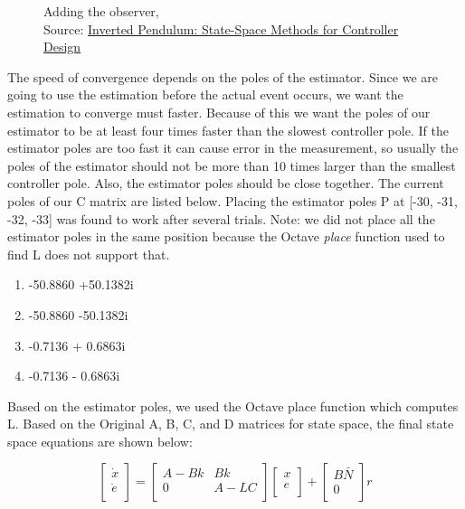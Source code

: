 \documentclass{article}
\begin{document}
\begin{figure}
\begin{minipage}[c]{0.45\textwidth}
{{	\label{fig:bd2}
}}
\end{minipage}
\caption{Adding the observer, \\ Source: \href{http://ctms.engin.umich.edu/CTMS/index.php?example=InvertedPendulum&section=ControlStateSpace}{Inverted Pendulum: State-Space Methods for Controller Design}}
\end{figure}


\clearpage

The speed of convergence depends on the poles of the estimator. Since we are going to use the estimation before the actual event occurs, we want the estimation to converge must faster. Because of this we want the poles of our estimator to be at least four times faster than the slowest controller pole. If the estimator poles are too fast it can cause error in the measurement, so usually the poles of the estimator should not be more than 10 times larger than the smallest controller pole. Also, the estimator poles should be close together. The current poles of our C matrix are listed below. Placing the estimator poles P at [-30, -31, -32, -33] was found to work after several trials. Note: we did not place all the estimator poles in the same position because the Octave \textit{place} function used to find L does not support that.
\begin{enumerate}
  \item  -50.8860 +50.1382i
  \item -50.8860 -50.1382i
  \item -0.7136 + 0.6863i
  \item -0.7136 - 0.6863i
\end{enumerate}

Based on the estimator poles, we used the Octave place function which computes L. Based on the Original A, B, C, and D matrices for state space, the final state space equations are shown below:

\begin{equation}
\label{ss3}
\begin{bmatrix}
\dot{x}\\
\dot{e}\\
\end{bmatrix}
=
\begin{bmatrix}
A-Bk&Bk\\
0&A-LC\\
\end{bmatrix}
\begin{bmatrix}
x\\
e\\
\end{bmatrix} +
\begin{bmatrix}
B\bar{N}\\
0\\
\end{bmatrix} r
\end{equation}
\end{document}
